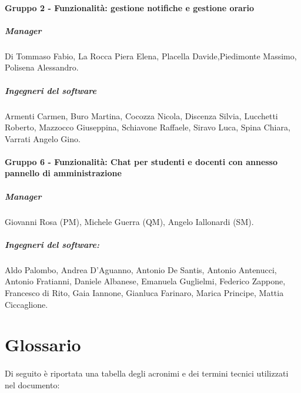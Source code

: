 \paragraph{Gruppo 2 - Funzionalità: gestione notifiche e gestione orario}
\subparagraph{Manager\\}
Di Tommaso Fabio, La Rocca Piera Elena, Placella Davide,Piedimonte Massimo, Polisena Alessandro.
\subparagraph{Ingegneri del software\\}
Armenti Carmen, Buro Martina, Cocozza Nicola, Discenza Silvia, Lucchetti Roberto, Mazzocco Giuseppina, Schiavone Raffaele, Siravo Luca, Spina Chiara, Varrati Angelo Gino.

\paragraph{Gruppo 6 - Funzionalità: Chat per studenti e docenti con annesso pannello di amministrazione\newline\newline} 
\subparagraph{Manager \\}
Giovanni Rosa (PM),
Michele Guerra (QM),
Angelo Iallonardi (SM).
\subparagraph{Ingegneri del software: \\}
Aldo Palombo,
Andrea D'Aguanno,
Antonio De Santis,
Antonio Antenucci,
Antonio Fratianni,
Daniele Albanese,
Emanuela Guglielmi,
Federico Zappone,
Francesco di Rito,
Gaia Iannone,
Gianluca Farinaro,
Marica Principe,
Mattia Ciccaglione.

\section{Glossario}

\paragraph{}
Di seguito è riportata una tabella degli acronimi e dei termini tecnici utilizzati nel documento:

